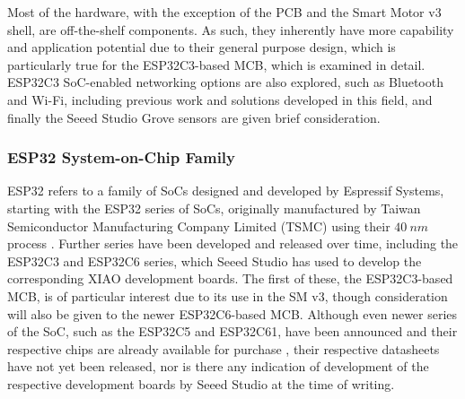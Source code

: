  Most of the hardware, with the exception of the PCB and the Smart Motor v3 shell, are off-the-shelf components. As such, they inherently have more capability and application potential due to their general purpose design, which is particularly true for the ESP32C3-based MCB, which is examined in detail. ESP32C3 SoC-enabled networking options are also explored, such as Bluetooth and Wi-Fi, including previous work and solutions developed in this field, and finally the Seeed Studio Grove sensors are given brief consideration.

\subsubsection{\label{sec:rev_esp}ESP32 System-on-Chip Family}

ESP32 refers to a family of SoCs designed and developed by Espressif Systems, starting with the ESP32 series of SoCs, originally manufactured by Taiwan Semiconductor Manufacturing Company Limited (TSMC) using their $40\ nm$ process \citep{espressif_systems_esp32_2025}.
Further series have been developed and released over time, including the ESP32C3 and ESP32C6 series, which Seeed Studio has used to develop the corresponding XIAO development boards. The first of these, the ESP32C3-based MCB, is of particular interest due to its use in the SM v3, though consideration will also be given to the newer ESP32C6-based MCB. Although even newer series of the SoC, such as the ESP32C5 and ESP32C61, have been announced and their respective chips are already available for purchase \citep{espressif_systems_esp_nodate}, their respective datasheets have not yet been released, nor is there any indication of development of the respective development boards by Seeed Studio at the time of writing.


